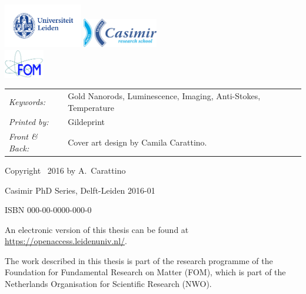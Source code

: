 \begin{titlepage}
\medskip

\vfill
\begin{center}
    \includegraphics[height=0.75in]{title/logos/leiden}
    \hspace{2em}
    \includegraphics[height=0.5in]{title/logos/casimir} \\
    \includegraphics[height=0.5in]{title/logos/fom}
\end{center}
\vfill

\noindent
\begin{tabular}{@{}p{}@{}p{}}
    \textit{Keywords:} & Gold Nanorods, Luminescence, Imaging,
    Anti-Stokes, Temperature
    \\[\medskipamount] \textit{Printed by:} & Gildeprint \\[\medskipamount]
    \textit{Front \& Back:} & Cover art design by Camila Carattino.
\end{tabular}

\vspace{4\bigskipamount}

\noindent Copyright \textcopyright\ 2016 by A.~Carattino

\noindent Casimir PhD Series, Delft-Leiden 2016-01

\medskip
\noindent ISBN 000-00-0000-000-0

\medskip
\noindent An electronic version of this thesis can be found at \\
\url{https://openaccess.leidenuniv.nl/}.

\medskip

The work described in this thesis is part of the research programme of the
Foundation for Fundamental Research on Matter (FOM), which is part of the
Netherlands Organisation for Scientific Research (NWO). 

\end{titlepage}

